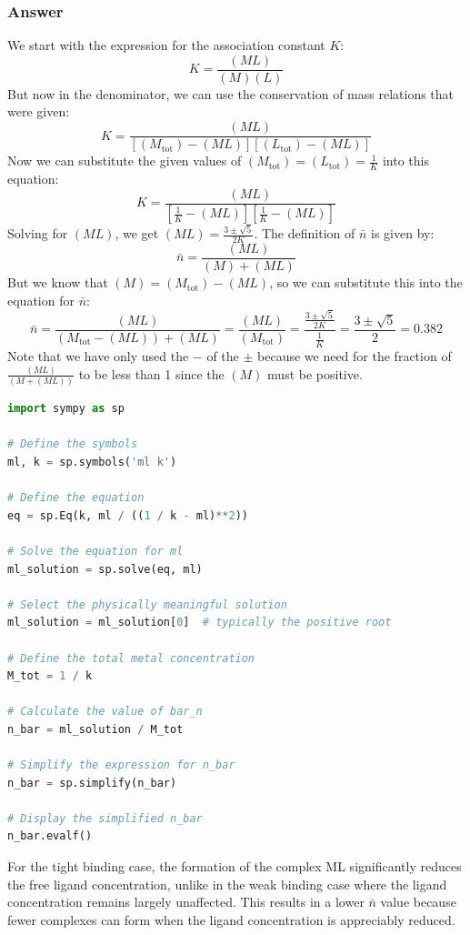 \documentclass[12pt]{article}
\begin{document}
\subsubsection{Answer}
We start with the expression for the association constant $K$:
\begin{equation}
K=\frac{(M L)}{(M)(L)}
\end{equation}
But now in the denominator, we can use the conservation of mass relations that were given:
\begin{equation}
K=\frac{(M L)}{\left[\left(M_{\text{tot}}\right)-(M L)\right]\left[\left(L_{\text{tot}}\right)-(M L)\right]}
\end{equation}
Now we can substitute the given values of $\left(M_{\text{tot}}\right)=\left(L_{\text{tot}}\right)=\frac{1}{K}$ into this equation:
\begin{equation}
K=\frac{(M L)}{\left[\frac{1}{K}-(M L)\right]\left[\frac{1}{K}-(M L)\right]}
\end{equation}
Solving for $(M L)$, we get $(M L)=\frac{3\pm\sqrt{5}}{2K}$. The definition of $\bar{n}$ is given by:
\begin{equation}
\bar{n}=\frac{(M L)}{(M)+(M L)}
\end{equation}
But we know that $(M) = (M_{\text{tot}}) - (M L)$, so we can substitute this into the equation for $\bar{n}$:
\begin{equation}
\bar{n}=\frac{(M L)}{(M_{\text{tot}} - (M L)) + (M L)}=\frac{(M L)}{(M_{\text{tot}})}=\frac{\frac{3\pm\sqrt{5}}{2K}}{\frac{1}{K}}=\frac{3\pm\sqrt{5}}{2}= 0.382
\end{equation}
Note that we have only used the $-$ of the $\pm$ because we need for the fraction of $\frac{(M L)}{(M+(M L))}$ to be less than 1 since the $(M)$ must be positive.
\begin{lstlisting}[language=Python]
import sympy as sp

# Define the symbols
ml, k = sp.symbols('ml k')

# Define the equation
eq = sp.Eq(k, ml / ((1 / k - ml)**2))

# Solve the equation for ml
ml_solution = sp.solve(eq, ml)

# Select the physically meaningful solution
ml_solution = ml_solution[0]  # typically the positive root

# Define the total metal concentration
M_tot = 1 / k

# Calculate the value of bar_n
n_bar = ml_solution / M_tot

# Simplify the expression for n_bar
n_bar = sp.simplify(n_bar)

# Display the simplified n_bar
n_bar.evalf()

\end{lstlisting}
For the tight binding case, the formation of the complex ML significantly reduces the free ligand concentration, unlike in the weak binding case where the ligand concentration remains largely unaffected. This results in a lower 
$\bar{n}$
 value because fewer complexes can form when the ligand concentration is appreciably reduced.
\end{document}
